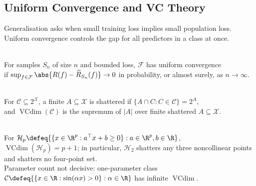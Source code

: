 \subsection{Uniform Convergence and VC Theory}

Generalisation asks when small training loss implies small population loss.  Uniform convergence controls the gap for all predictors in a class at once.

\begin{definition} \label{def:sl-uniform-convergence} \\
For samples $S_n$ of size $n$ and bounded loss, $\mathcal{F}$ has uniform convergence\\
if $\sup_{f\in\mathcal{F}}\abs{R(f)-\widehat{R}_{S_n}(f)}\to0$ in probability, or almost surely, as $n\to\infty$.
\end{definition}

\begin{definition} \label{def:sl-vc-dimension} \\
For $\mathcal{C}\subseteq2^{\mathcal{X}}$, a finite $A\subseteq\mathcal{X}$ is shattered if $\{A\cap C:C\in\mathcal{C}\}=2^A$,\\
and $\operatorname{VCdim}(\mathcal{C})$ is the supremum of $|A|$ over finite shattered $A\subseteq\mathcal{X}$.
\end{definition}

\begin{example} \label{ex:sl-vc-shattering-examples} \\
For $\mathcal{H}_p\defeq\{\{x\in\R^p:a^\top x+b\geq0\}:a\in\R^p,b\in\R\}$, $\operatorname{VCdim}(\mathcal{H}_p)=p+1$; in particular, $\mathcal{H}_2$ shatters any three noncollinear points and shatters no four-point set.\\
Parameter count not decisive: one-parameter class $\mathcal{C}\defeq\{\{x\in\R:\sin(\alpha x)>0\}:\alpha\in\R\}$ has infinite $\operatorname{VCdim}$.
\end{example}

